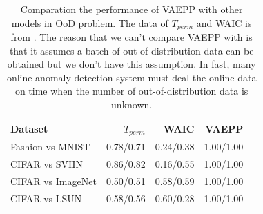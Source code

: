 \begin{table}[tb]
\centering
\begin{tabular}{lrrrr}  
\toprule
Dataset  &  $T_{perm}$ & WAIC & VAEPP\\
\midrule
Fashion vs MNIST  & 0.78/0.71  & 0.24/0.38 & 1.00/1.00  \\
CIFAR vs SVHN     & 0.86/0.82  & 0.16/0.55 & 1.00/1.00  \\
CIFAR vs ImageNet & 0.50/0.51  & 0.58/0.59 & 1.00/1.00  \\
CIFAR vs LSUN     & 0.58/0.56  & 0.60/0.28 & 1.00/1.00  \\
\bottomrule
\end{tabular}
\caption{Comparation the performance of VAEPP with other models in OoD problem. The data of $T_{perm}$ and WAIC is from \protect \cite{song2019unsupervised}. The reason that we can't compare VAEPP with \protect\cite{song2019unsupervised} is that it assumes a batch of out-of-distribution data can be obtained but we don't have this assumption. In fast, many online anomaly detection system must deal the online data on time when the number of out-of-distribution data is unknown. }
\label{tab:compare_ood_other_datasets}
\end{table}

